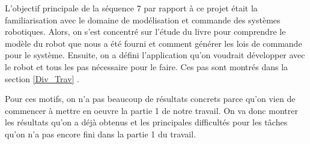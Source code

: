 

L'objectif principale de la séquence 7 par rapport à ce projet était la familiarisation avec le domaine de modélisation et commande des systèmes robotiques. Alors, on s'est concentré sur l'étude du livre %
\cite{khalil2004modeling} pour comprendre le modèle du robot que nous a été fourni et comment générer les lois de commande pour le système. Ensuite, on a défini l'application qu'on voudrait développer avec le robot et tous les pas nécessaire pour le faire. Ces pas sont montrés dans la section \ref{Div_Trav}%
.

Pour ces motifs, on n'a pas beaucoup de résultats concrets parce qu'on vien de commencer à mettre en oeuvre la partie 1 de notre travail. On va donc montrer les résultats qu'on a déjà obtenus et les principales difficultés pour les tâches qu'on n'a pas encore fini dans la partie 1 du travail.
